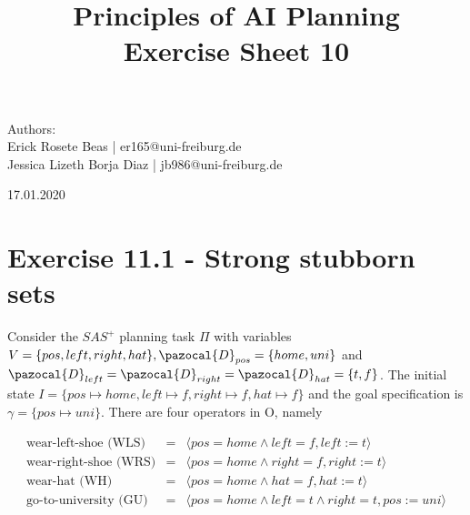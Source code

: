 \documentclass[11pt,a4paper]{article}
\title{\textbf{Principles of AI Planning
		\\{\Large Exercise Sheet 10}}}
\begin{document}
\begin{flushleft}
	Authors:\\
	Erick Rosete Beas | er165@uni-freiburg.de\\
	Jessica Lizeth Borja Diaz | jb986@uni-freiburg.de\\
\end{flushleft}
{\let\newpage\relax\maketitle}
\begin{center} 
	\large 17.01.2020
\end{center}


\section*{Exercise 11.1 - Strong stubborn sets}
Consider the $SAS^+$ planning task $\Pi$ with variables 
$V =\{pos,left,right,hat \}, \pazocal{D}_{pos}=\{
home,uni\}$ and $\pazocal{D}_{left}=\pazocal{D}_{right}=\pazocal{D}_{hat}
=\{t,f\}$. The initial state $I = \{pos \mapsto home, left \mapsto f,
right \mapsto f, hat \mapsto f\}$ and the goal specification is
$\gamma = \{pos \mapsto uni\}$. There are four operators in O, namely

\[ \begin{array}{rcl}
	\mbox{wear-left-shoe (WLS)}  & = & \langle pos=home \land left = f, left:=t \rangle\\
	\mbox{wear-right-shoe (WRS)} & = & \langle pos=home \land right = f, right:=t \rangle\\
	\mbox{wear-hat (WH)} 	   & = & \langle pos=home \land hat = f, hat:=t \rangle\\
	\mbox{go-to-university (GU)}& = & \langle pos=home \land left = t \land right = t, pos:=uni \rangle\\
\end{array}\] 
\end{document}
